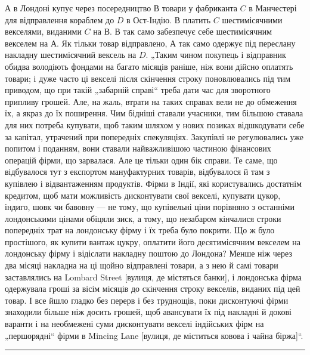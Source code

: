 $А$ в Лондоні купує через посередництво $В$ товари у фабриканта $C$ в Манчестері для відправлення кораблем
до $D$ в Ост-Індію. $В$ платить $C$ шестимісячними векселями, виданими $C$ на $В$. В так само забезпечує себе
шестимісячним
векселем на $А$. Як тільки товар відправлено, $А$ так само одержує під переслану
накладну шестимісячний вексель на $D$. „Таким чином покупець і відправник
обидва володіють фондами на багато місяців раніше, ніж вони дійсно оплатять
товари; і дуже часто ці векселі після скінчення строку поновлювались під тим
приводом, що при такій „забарній справі“ треба дати час для зворотного припливу грошей. Але, на
жаль, втрати на таких справах вели не до обмеження
їх, а якраз до їх поширення. Чим бідніші ставали учасники, тим більшою ставала для них потреба
купувати, щоб таким шляхом у нових позиках відшкодувати
себе за капітал, утрачений при попередніх спекуляціях. Закупівлі не регулювались уже попитом і
поданням, вони ставали найважливішою частиною фінансових
операцій фірми, що зарвалася. Але це тільки один бік справи. Те саме, що відбувалося тут з експортом
мануфактурних товарів, відбувалося й там з купівлею
і відвантаженням продуктів. Фірми в Індії, які користувались достатнім кредитом,
щоб мати можливість дисконтувати свої векселі, купувати цукор, індиго, шовк
чи бавовну — не тому, що купівельні ціни порівняно з останніми лондонськими
цінами обіцяли зиск, а тому, що незабаром кінчалися строки попередніх трат на
лондонську фірму і їх треба було покрити. Що ж було простішого, як купити вантаж цукру, оплатити
його десятимісячним векселем на лондонську фірму і відіслати накладну поштою до Лондона? Менше ніж
через два місяці накладна на
ці щойно відправлені товари, а з нею й самі товари заставлялись на Lombard
Street [вулиця, де містяться банки], і лондонська фірма одержувала гроші за
вісім місяців до скінчення строку векселів, виданих під цей товар. І все йшло
гладко без перерв і без труднощів, поки дисконтуючі фірми знаходили більше
ніж досить грошей, щоб авансувати їх під накладні й докові варанти і на необмежені суми дисконтувати
векселі індійських фірм на „першорядні“ фірми в
Mincing Lane [вулиця, де міститься ковова і чайна біржа]“.

\pfbreak

